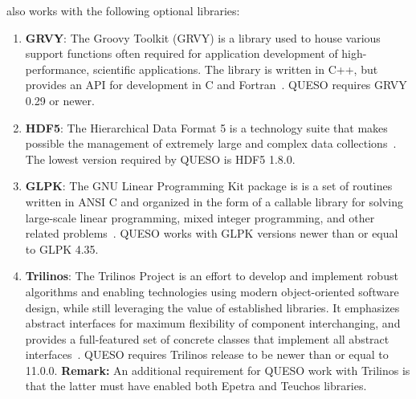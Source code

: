 \Queso{} also works with the following optional libraries:




\begin{enumerate}%


\item \textbf{GRVY}: The Groovy Toolkit (GRVY) is a library used to house various support functions often required for application development of high-performance, scientific applications. The library is written in C++, but provides an API for development in C and Fortran~\cite{grvy}. QUESO requires GRVY 0.29 or newer.

\item \textbf{HDF5}: The Hierarchical Data Format 5 is a technology suite that makes possible the management of extremely large and complex data collections~\cite{HDF5}. The lowest version required by QUESO is HDF5 1.8.0.

\item \textbf{GLPK}: The GNU Linear Programming Kit package is is a set of routines written in ANSI C and organized in the form of a callable library for solving large-scale linear programming, mixed integer programming, and other related problems~\cite{GLPK}. QUESO works with GLPK versions newer than or equal to  GLPK 4.35.
% 
% 
 \item{ \textbf{Trilinos}: The Trilinos Project is an effort to develop and implement robust algorithms and enabling technologies using modern object-oriented software design, while still leveraging the value of established libraries. It emphasizes abstract interfaces for maximum flexibility of component interchanging, and provides a full-featured set of concrete classes that implement all abstract interfaces~\cite{Trilinos,TrilinosPage}. QUESO requires Trilinos release to be newer than or equal to  11.0.0.
 {\bf Remark:} An additional requirement for QUESO work with Trilinos is that the latter must have enabled both Epetra and Teuchos libraries.}

\end{enumerate}%
% 


